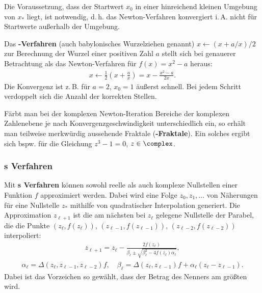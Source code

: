 Die Voraussetzung, dass der Startwert $x_0$ in einer hinreichend kleinen
Umgebung von $x_\ast$ liegt, ist notwendig, d.\,h. das Newton-Verfahren
konvergiert i.\,A. nicht für Startwerte außerhalb der Umgebung.

\linie

Das \textbf{-Verfahren} (auch babylonisches Wurzelziehen genannt)
$x \leftarrow (x + a/x) / 2$ zur Berechnung der Wurzel einer positiven Zahl $a$
stellt sich bei genauerer Betrachtung
als das Newton-Verfahren für $f(x) = x^2 - a$ heraus:
\begin{align*}
    x \leftarrow \frac{1}{2} \left(x + \frac{a}{x}\right)
    = x - \frac{x^2 - a}{2x}.
\end{align*}
Die Konvergenz ist z.\,B. für $a = 2$, $x_0 = 1$ äußerst schnell.
Bei jedem Schritt verdoppelt sich die Anzahl der korrekten Stellen.

\linie

Färbt man bei der komplexen Newton-Iteration Bereiche der komplexen Zahlenebene
je nach Konvergenzgeschwindigkeit unterschiedlich ein, so erhält man
teilweise merkwürdig aussehende Fraktale (\textbf{-Fraktale}).
Ein solches ergibt sich bspw. für die Gleichung
$z^3 - 1 = 0$, $z \in \complex$.

\subsubsection{%
    s Verfahren%
}

Mit \textbf{s Verfahren} können sowohl reelle als auch komplexe
Nullstellen einer Funktion $f$ approximiert werden.
Dabei wird eine Folge $z_0, z_1, \dotsc$ von Näherungen für eine Nullstelle
$z_\ast$ mithilfe von quadratischer Interpolation generiert.
Die Approximation $z_{\ell+1}$ ist die am nächsten bei $z_\ell$ gelegene
Nullstelle der Parabel, die die Punkte $(z_\ell, f(z_\ell))$,
$(z_{\ell-1}, f(z_{\ell-1}))$, $(z_{\ell-2}, f(z_{\ell-2}))$ interpoliert:
\begin{align*}
    z_{\ell+1} = z_\ell -
    \frac{2 f(z_\ell)}{\beta_\ell \pm
    \sqrt{\beta_\ell^2 - 4 f(z_\ell) \alpha_\ell}},
\end{align*}
\begin{align*}
    \alpha_\ell = \Delta(z_\ell, z_{\ell-1}, z_{\ell-2}) f, \quad
    \beta_\ell =
    \Delta(z_\ell, z_{\ell-1}) f + \alpha_\ell(z_\ell - z_{\ell-1}).
\end{align*}
Dabei ist das Vorzeichen so gewählt, dass der Betrag des Nenners am größten
wird.

